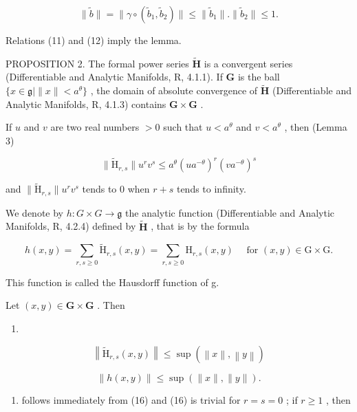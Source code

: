 \[
\| \tilde {b} \| = \| \gamma \circ (\tilde {b} _ {1}, \tilde {b} _ {2}) \| \leqslant \| \tilde {b} _ {1} \|. \| \tilde {b} _ {2} \| \leqslant 1.\tag{13}
\]

Relations (11) and (12) imply the lemma.

PROPOSITION 2. The formal power series \(\tilde{\mathbf{H}}\) is a convergent series (Differentiable and Analytic Manifolds, R, 4.1.1). If \(\mathbf{G}\) is the ball \(\{x\in\mathfrak{g}\mid\|x\|<a^{\theta}\}\) , the domain of absolute convergence of \(\tilde{\mathbf{H}}\) (Differentiable and Analytic Manifolds, R, 4.1.3) contains \(\mathbf{G}\times\mathbf{G}\) .

If \(u\) and \(v\) are two real numbers \(>0\) such that \(u < a^{\theta}\) and \(v < a^{\theta}\) , then (Lemma 3)

\[
\| \tilde {\mathrm{H}} _ {r, s} \| u ^ {r} v ^ {s} \leqslant a ^ {\theta} (u a ^ {- \theta}) ^ {r} (v a ^ {- \theta}) ^ {s}\tag{14}
\]

and \(\| \tilde{\mathrm{H}}_{r,s}\| u^r v^s\) tends to 0 when \(r + s\) tends to infinity.

We denote by \(h \colon G \times G \to \mathfrak{g}\) the analytic function (Differentiable and Analytic Manifolds, R, 4.2.4) defined by \(\tilde{\mathbf{H}}\) , that is by the formula

\[
h (x, y) = \sum_ {r, s \geqslant 0} \tilde {\mathrm{H}} _ {r, s} (x, y) = \sum_ {r, s \geqslant 0} \mathrm{H} _ {r, s} (x, y) \quad \text { for } (x, y) \in \mathrm{G} \times \mathrm{G}.\tag{15}
\]

This function is called the Hausdorff function of g.

Let \((x,y)\in \mathbf{G}\times \mathbf{G}\) . Then

\begin{enumerate}
\def\labelenumi{(\arabic{enumi})}
\setcounter{enumi}{15}
\tightlist
\item
\end{enumerate}

\[
\left\| \tilde {\mathrm{H}} _ {r, s} (x, y) \right\| \leqslant \sup (\left\| x \right\|, \left\| y \right\|)\tag{16}
\]

\[
\| h (x, y) \| \leqslant \sup (\| x \|, \| y \|).\tag{17}
\]

\begin{enumerate}
\def\labelenumi{(\arabic{enumi})}
\setcounter{enumi}{16}
\tightlist
\item
  follows immediately from (16) and (16) is trivial for \(r = s = 0\) ; if \(r \geqslant 1\) , then
\end{enumerate}

